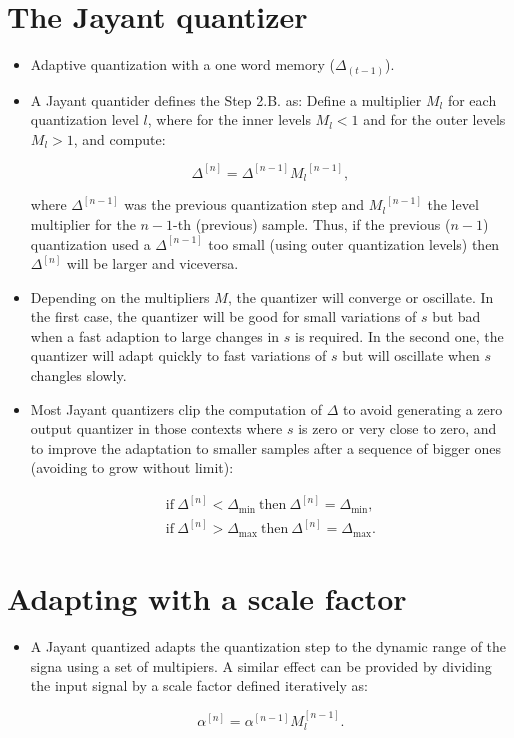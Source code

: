 \section{The Jayant quantizer~\cite{jayant1974digital}}
\begin{itemize}
\item
  Adaptive quantization with a one word memory (\(\Delta_{(t-1)}\)).
\item
  A Jayant quantider defines the Step 2.B. as: Define a multiplier
  \(M_l\) for each quantization level \(l\), where for the inner levels
  \(M_l<1\) and for the outer levels \(M_l>1\), and compute:

  \[
    \Delta^{[n]} = \Delta^{[n-1]}{M_l}^{[n-1]},
  \]

  where \(\Delta^{[n-1]}\) was the previous quantization step and
  \({M_l}^{[n-1]}\) the level multiplier for the \(n-1\)-th (previous)
  sample. Thus, if the previous (\(n-1\)) quantization used a
  \(\Delta^{[n-1]}\) too small (using outer quantization levels) then
  \(\Delta^{[n]}\) will be larger and viceversa.
\item
  Depending on the multipliers \(M\), the quantizer will converge or
  oscillate. In the first case, the quantizer will be good for small
  variations of \(s\) but bad when a fast adaption to large changes in
  \(s\) is required. In the second one, the quantizer will adapt quickly
  to fast variations of \(s\) but will oscillate when \(s\) changles
  slowly.
\item
  Most Jayant quantizers clip the computation of \(\Delta\) to avoid
  generating a zero output quantizer in those contexts where \(s\) is
  zero or very close to zero, and to improve the adaptation to smaller
  samples after a sequence of bigger ones (avoiding to grow without
  limit):

  \[
  \begin{array}{ll}
    \text{if}~\Delta^{[n]}<\Delta_{\text{min}}~\text{then}~\Delta^{[n]} = \Delta_{\text{min}},\\
    \text{if}~\Delta^{[n]}>\Delta_{\text{max}}~\text{then}~\Delta^{[n]} = \Delta_{\text{max}}.
  \end{array}
  \]
\end{itemize}

\section{Adapting with a scale factor}
\begin{itemize}
\item
  A Jayant quantized adapts the quantization step to the dynamic range
  of the signa using a set of multipiers. A similar effect can be
  provided by dividing the input signal by a scale factor defined
  iteratively as:

  \begin{equation}
    \alpha^{[n]} = \alpha^{[n-1]}M_l^{[n-1]}.
  \end{equation}
\end{itemize}

